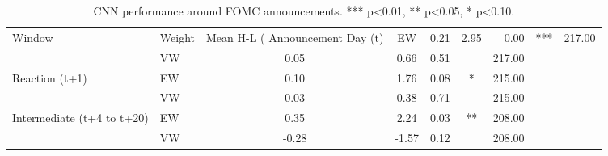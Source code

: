 \begin{table}[ht]
\centering
\caption{CNN performance around FOMC announcements. *** p<0.01, ** p<0.05, * p<0.10.}
\label{tab:fomc_event}
\begin{tabular}{llccccr}
\toprule
Window & Weight & Mean H-L (%
\midrule
Announcement Day (t) & EW & 0.21 & 2.95 & 0.00 & *** & 217.00 \\
 & VW & 0.05 & 0.66 & 0.51 &  & 217.00 \\
Reaction (t+1) & EW & 0.10 & 1.76 & 0.08 & * & 215.00 \\
 & VW & 0.03 & 0.38 & 0.71 &  & 215.00 \\
Intermediate (t+4 to t+20) & EW & 0.35 & 2.24 & 0.03 & ** & 208.00 \\
 & VW & -0.28 & -1.57 & 0.12 &  & 208.00 \\
\bottomrule
\end{tabular}
\end{table}
